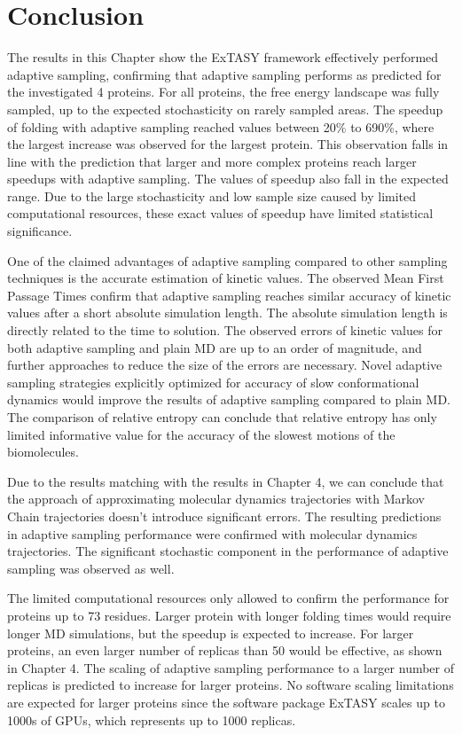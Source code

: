 \section{\label{sec:conclusion}Conclusion}

The results in this Chapter show the ExTASY framework \cite{Extasy2019} effectively
performed adaptive sampling, confirming that adaptive sampling performs as predicted for the investigated 4 proteins. 
For all proteins, the free energy landscape was fully sampled, up to the expected stochasticity on rarely sampled areas. The speedup of folding with adaptive sampling reached values between 20\% to 690\%, where the largest increase was observed for the largest protein. This observation falls in line with the prediction that larger and more complex proteins reach larger speedups with adaptive sampling. The values of speedup also fall in the expected range. Due to the large stochasticity and low sample size caused by limited computational resources, these exact values of speedup have limited statistical significance. 

One of the claimed advantages of adaptive sampling compared to other sampling techniques is the accurate estimation of kinetic values. The observed Mean First Passage Times confirm that adaptive sampling reaches similar accuracy of kinetic values after a short absolute simulation length. The absolute simulation length is directly related to the time to solution. The observed errors of kinetic values for both adaptive sampling and plain MD are up to an order of magnitude, and further approaches to reduce the size of the errors are necessary. Novel adaptive sampling strategies explicitly optimized for accuracy of slow conformational dynamics would improve the results of adaptive sampling compared to plain MD. The comparison of relative entropy can conclude that relative entropy has only limited informative value for the accuracy of the slowest motions of the biomolecules.  
 

Due to the results matching with the results in Chapter 4, we can conclude that the approach of approximating molecular dynamics trajectories with Markov Chain trajectories doesn't introduce significant errors. The resulting predictions in adaptive sampling performance were confirmed with molecular dynamics trajectories. The significant stochastic component in the performance of adaptive sampling was observed as well.


The limited computational resources only allowed to confirm the performance for proteins up to 73 residues. Larger protein with longer folding times would require longer MD simulations, but the speedup is expected to increase. For larger proteins, an even larger number of replicas than 50 would be effective, as shown in Chapter 4. The scaling of adaptive sampling performance to a larger number of replicas is predicted to increase for larger proteins. No software scaling limitations are expected for larger proteins since the software package ExTASY scales up to 1000s of GPUs, which represents up to 1000 replicas.